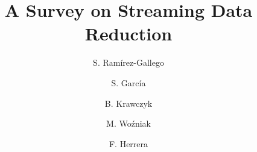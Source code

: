 \documentclass[preprint,12pt]{elsarticle}
\begin{document}
\begin{frontmatter}



\title{A Survey on Streaming Data Reduction}


\author[ugr]{S. Ram\'{i}rez-Gallego}

\author[ugr]{S. Garc\'ia}

\author[pwr]{B. Krawczyk}

\author[pwr]{M. Wo\'zniak}

\author[ugr]{F. Herrera}

\address[ugr]{Department of Computer Science and Artificial Intelligence, CITIC-UGR, University of Granada, 18071 Granada, Spain}
	
\address[pwr]{Department of Computer Science, Wroc\l{}aw University of Technology, Wyb. Wyspianskiego 27, 50-370 Wroc\l{}aw, Poland}


\begin{abstract}


\end{abstract}
\end{frontmatter}
\end{document}
